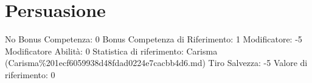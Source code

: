 \section{Persuasione}\label{persuasione}

\begin{description}
\tightlist
\item[Tags: ABI]
No Bonus Competenza: 0 Bonus Competenza di Riferimento: 1 Modificatore:
-5 Modificatore Abilità: 0 Statistica di riferimento: Carisma
(Carisma\%201ecf6059938d48fdad0224e7cacbb4d6.md) Tiro Salvezza: -5
Valore di riferimento: 0
\end{description}
